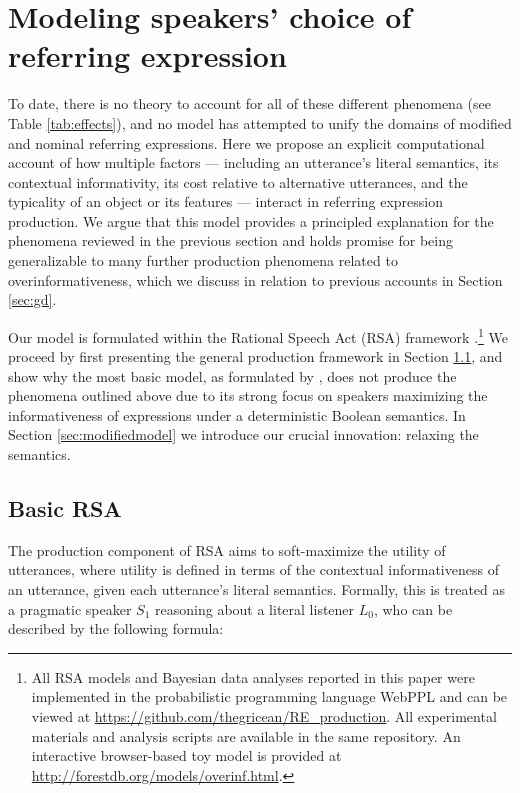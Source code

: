 \documentclass[11pt]{article}
\newcommand{\tableref}[1]{Table \ref{#1}}
\newcommand{\sectionref}[1]{Section \ref{#1}}
\begin{document}
\section[]{Modeling speakers' choice of referring expression}
\label{sec:models}

To date, there is no theory to account for all of these different phenomena (see \tableref{tab:effects}), and no model has attempted to unify the domains of modified and nominal referring expressions. 
Here we propose an explicit computational account of how multiple factors --- including an utterance's literal semantics, its contextual informativity, its cost relative to alternative utterances, and the typicality of an object or its features --- interact in referring expression production.
We argue that this model provides a principled explanation for the phenomena reviewed in the previous section and holds promise for being generalizable to many further production phenomena related to overinformativeness, which we discuss in relation to previous accounts in \sectionref{sec:gd}. 



Our model is formulated within the Rational Speech Act (RSA) framework \cite{frank2012, goodman2016}.\footnote{All RSA models and Bayesian data analyses reported in this paper were implemented in the probabilistic programming language WebPPL \cite{GoodmanStuhlmuller14_DIPPL} and can be viewed at \url{https://github.com/thegricean/RE_production}. All experimental materials and analysis scripts are available in the same repository. An interactive browser-based toy model is provided at \url{http://forestdb.org/models/overinf.html}.} 
We proceed by first presenting the general production framework in \sectionref{sec:basicrsa}, and show why the most basic model, as formulated by , does not produce the phenomena outlined above due to its strong focus on speakers maximizing the informativeness of expressions under a deterministic Boolean semantics. In \sectionref{sec:modifiedmodel} we introduce our crucial innovation: relaxing the semantics. 

\subsection{Basic RSA}
\label{sec:basicrsa}


The production component of RSA aims to soft-maximize the utility of utterances, where utility is defined in terms of the contextual informativeness of an utterance, given each utterance's literal semantics. Formally, this is treated as a pragmatic speaker $S_1$ reasoning about a literal listener $L_0$, who can be described by the following formula:
\end{document}
